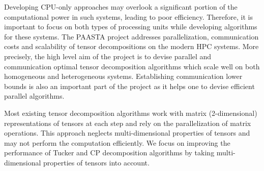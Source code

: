 \documentclass[a4paper,11pt, margin=2cm]{article}
\newcommand{\bora}[1]{{\color{magenta} \emph{#1}}}
\begin{document}
	Developing CPU-only approaches may overlook a significant portion of the computational power in such systems, leading to poor efficiency. Therefore, it is important to focus on both types of processing units while developing algorithms for these systems.
	The PAASTA project addresses parallelization, communication costs and scalability of tensor decompositions on the modern HPC systems. More precisely, the high level aim of the project is to devise parallel and communication optimal tensor decomposition algorithms which scale well on both homogeneous and heterogeneous systems. Establishing communication lower bounds is also an important part of the project as it helps one to devise efficient parallel algorithms.
	
	
	
	Most existing tensor decomposition algorithms work with matrix (2-dimensional) representations of tensors at each step and rely on the parallelization of matrix operations. This approach neglects multi-dimensional properties of tensors and may not perform the computation efficiently. We focus on improving the performance of Tucker and CP decomposition algorithms by taking multi-dimensional properties of tensors into account.
	
	
	
\end{document}

